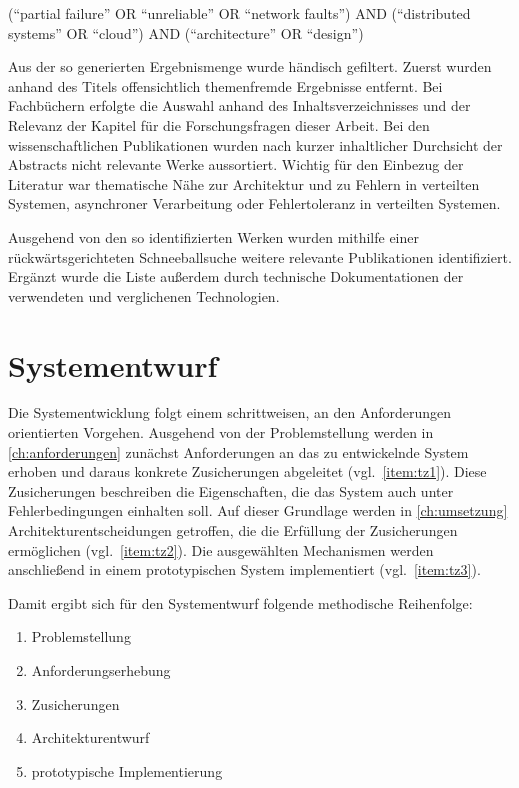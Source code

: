(\enquote{partial failure} OR \enquote{unreliable} OR \enquote{network faults}) AND (\enquote{distributed systems}
OR \enquote{cloud}) AND (\enquote{architecture} OR \enquote{design})

Aus der so generierten Ergebnismenge wurde händisch gefiltert.
Zuerst wurden anhand des Titels offensichtlich themenfremde Ergebnisse entfernt.
Bei Fachbüchern erfolgte die Auswahl anhand des Inhaltsverzeichnisses und der Relevanz der Kapitel für die Forschungsfragen
dieser Arbeit.
Bei den wissenschaftlichen Publikationen wurden nach kurzer inhaltlicher Durchsicht der Abstracts nicht relevante Werke aussortiert.
Wichtig für den Einbezug der Literatur war thematische Nähe zur Architektur und zu Fehlern in verteilten Systemen, asynchroner Verarbeitung
oder Fehlertoleranz in verteilten Systemen.

Ausgehend von den so identifizierten Werken wurden mithilfe einer rückwärtsgerichteten Schneeballsuche weitere relevante
Publikationen identifiziert.
Ergänzt wurde die Liste außerdem durch technische Dokumentationen der verwendeten und verglichenen Technologien.

\section{Systementwurf}
\label{sec:systementwurf}
Die Systementwicklung folgt einem schrittweisen, an den Anforderungen orientierten Vorgehen.
Ausgehend von der Problemstellung werden in \cref{ch:anforderungen} zunächst Anforderungen an das zu entwickelnde System
erhoben und daraus konkrete Zusicherungen abgeleitet (vgl.~\ref{item:tz1}).
Diese Zusicherungen beschreiben die Eigenschaften, die das System auch unter Fehlerbedingungen einhalten soll.
Auf dieser Grundlage werden in \cref{ch:umsetzung} Architekturentscheidungen getroffen, die die Erfüllung
der Zusicherungen ermöglichen (vgl.~\ref{item:tz2}).
Die ausgewählten Mechanismen werden anschließend in einem prototypischen System implementiert (vgl.~\ref{item:tz3}).

Damit ergibt sich für den Systementwurf folgende methodische Reihenfolge:
\begin{enumerate}
    \item{Problemstellung}
    \item{Anforderungserhebung}
    \item{Zusicherungen}
    \item{Architekturentwurf}
    \item{prototypische Implementierung}
\end{enumerate}

